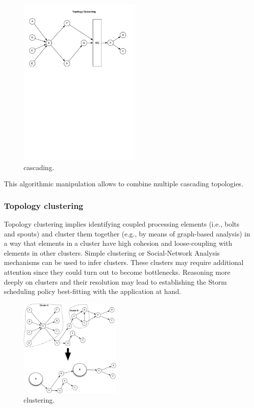 \begin{figure}[H]
	\begin{center}
		\includegraphics[width=6cm]{images/cascading}
		\caption{cascading.}
		\label{fig:cascading}
	\end{center}
\end{figure}

This algorithmic manipulation allows to combine multiple cascading topologies.

\subsubsection{Topology clustering}
Topology clustering implies identifying coupled processing elements (i.e., bolts and spouts) and cluster them together (e.g., by means of graph-based analysis) in a way that elements in a cluster have high cohesion and loose-coupling with elements in other clusters. Simple clustering or Social-Network Analysis mechanisms can be used to infer clusters. These clusters may require additional attention since they could turn out to become bottlenecks. Reasoning more deeply on clusters and their resolution may lead to establishing the Storm scheduling policy best-fitting with the application at hand.

\begin{figure}[H]
	\begin{center}
		\includegraphics[width=5cm]{images/clustering}
		\caption{clustering.}
		\label{fig:clustering}
	\end{center}
\end{figure}


